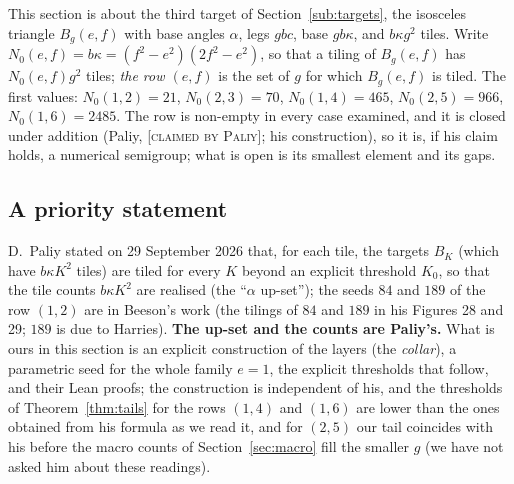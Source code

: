 \documentclass[11pt,reqno]{amsart}
\theoremstyle{plain}
\theoremstyle{definition}
\newcommand{\lab}[1]{\textup{[\textsc{#1}]}}
\newcommand{\CP}{\lab{claimed by Paliy}}
\begin{document}
This section is about the third target of Section~\ref{sub:targets}, the isosceles triangle $B_g(e,f)$ with base angles $\alpha$, legs $gbc$, base $gb\kappa$, and $b\kappa g^2$ tiles.
Write $N_0(e,f)=b\kappa=(f^2-e^2)(2f^2-e^2)$, so that a tiling of $B_g(e,f)$ has $N_0(e,f)g^2$ tiles; \emph{the row $(e,f)$} is the set of $g$ for which $B_g(e,f)$ is tiled.
The first values: $N_0(1,2)=21$, $N_0(2,3)=70$, $N_0(1,4)=465$, $N_0(2,5)=966$, $N_0(1,6)=2485$.
The row is non-empty in every case examined, and it is closed under addition (Paliy, \CP{}; his construction), so it is, if his claim holds, a numerical semigroup; what is open is its smallest element and its gaps.

\subsection{A priority statement}
D.~Paliy stated on 29 September 2026 \cite{PaliyRepo} that, for each tile, the targets $B_K$ (which have $b\kappa K^2$ tiles) are tiled for every $K$ beyond an explicit threshold $K_0$, so that the tile counts $b\kappa K^2$ are realised (the ``$\alpha$ up-set''); the seeds $84$ and $189$ of the row $(1,2)$ are in Beeson's work (the tilings of $84$ and $189$ in his Figures 28 and 29; $189$ is due to Harries).
\textbf{The up-set and the counts are Paliy's.}
What is ours in this section is an explicit construction of the layers (the \emph{collar}), a parametric seed for the whole family $e=1$, the explicit thresholds that follow, and their Lean proofs; the construction is independent of his, and the thresholds of Theorem~\ref{thm:tails} for the rows $(1,4)$ and $(1,6)$ are lower than the ones obtained from his formula as we read it, and for $(2,5)$ our tail coincides with his before the macro counts of Section~\ref{sec:macro} fill the smaller $g$ (we have not asked him about these readings).
\end{document}
